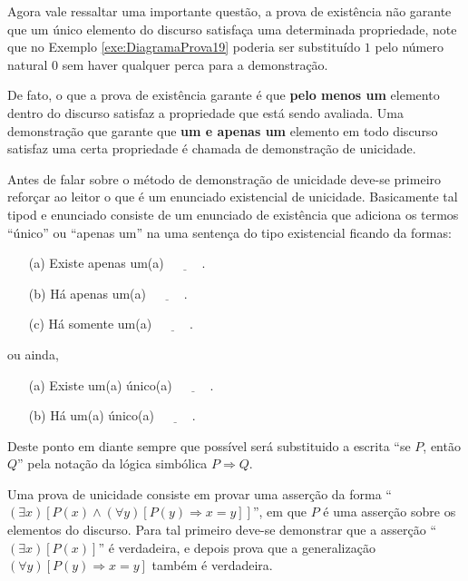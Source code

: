 Agora vale ressaltar uma importante questão, a prova de existência não garante que um único elemento do discurso satisfaça uma determinada propriedade, note que no Exemplo \ref{exe:DiagramaProva19} poderia ser substituído $1$ pelo número natural $0$ sem haver qualquer perca para a demonstração. 

De fato, o que a prova de existência garante é que \textbf{pelo menos um} elemento dentro do discurso satisfaz a propriedade que está sendo avaliada. Uma demonstração que garante que \textbf{um e apenas um} elemento em todo discurso satisfaz uma certa propriedade é chamada de demonstração de unicidade.

Antes de falar sobre o método de demonstração de unicidade deve-se primeiro reforçar ao leitor o que é um enunciado existencial de unicidade. Basicamente tal tipod e enunciado consiste de um enunciado de existência que adiciona os termos ``único'' ou ``apenas um'' na uma sentença do tipo existencial ficando da formas:
\begin{itemize}
	\item[(a)] Existe apenas um(a) $\underline{\ \ \ \ \ \ \ \ \ \ \ \ }$.
	\item[(b)] Há apenas um(a) $\underline{\ \ \ \ \ \ \ \ \ \ \ \ }$.
  \item[(c)] Há somente um(a) $\underline{\ \ \ \ \ \ \ \ \ \ \ \ }$.
\end{itemize}
ou ainda,
\begin{itemize}
	\item[(a)] Existe um(a) único(a) $\underline{\ \ \ \ \ \ \ \ \ \ \ \ }$.
	\item[(b)] Há  um(a) único(a) $\underline{\ \ \ \ \ \ \ \ \ \ \ \ }$.
\end{itemize}

\begin{atencao}
	Deste ponto em diante sempre que possível será substituido a escrita ``se $P$, então $Q$'' pela notação da lógica simbólica $P \Rightarrow Q$.
\end{atencao}

\begin{definicao}\label{def:ProvaUnicidade}
	Uma prova de unicidade consiste em provar uma asserção da forma ``$(\exists x)[P(x) \land (\forall y)[P(y) \Rightarrow x = y]]$'', em que $P$ é uma asserção sobre os elementos do discurso. Para tal primeiro deve-se demonstrar que a asserção ``$(\exists x)[P(x)]$'' é verdadeira, e depois prova que a generalização $(\forall y)[P(y) \Rightarrow x = y]$ também é verdadeira.
\end{definicao}


